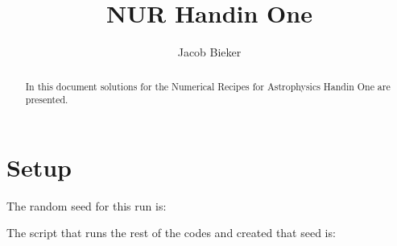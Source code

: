 \documentclass[a4paper,10pt]{article}
\title{NUR Handin One}
\author{Jacob Bieker}
\begin{document}
\maketitle

\begin{abstract}
 In this document solutions for the Numerical Recipes for Astrophysics Handin One are presented.
\end{abstract}

\section{Setup}

The random seed for this run is:



The script that runs the rest of the codes and created that seed is:










\end{document}
